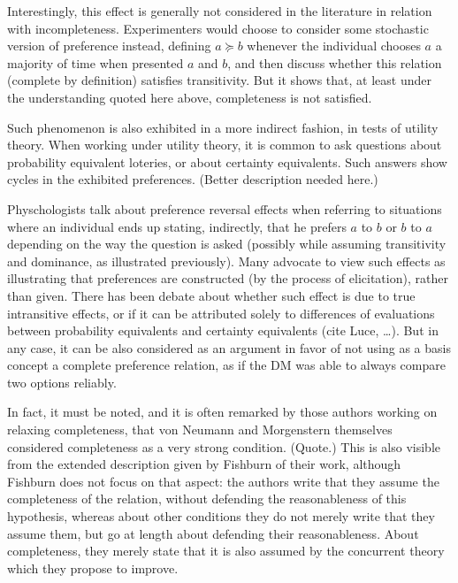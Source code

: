 \documentclass[french, english]{llncs}
\begin{document}
Interestingly, this effect is generally not considered in the literature in relation with incompleteness. Experimenters would choose to consider some stochastic version of preference instead, defining $a \succeq b$ whenever the individual chooses $a$ a majority of time when presented $a$ and $b$, and then discuss whether this relation (complete by definition) satisfies transitivity. But it shows that, at least under the understanding quoted here above, completeness is not satisfied.

Such phenomenon is also exhibited in a more indirect fashion, in tests of utility theory. When working under utility theory, it is common to ask questions about probability equivalent loteries, or about certainty equivalents. Such answers show cycles in the exhibited preferences. (Better description needed here.) 

Physchologists talk about preference reversal effects when referring to situations where an individual ends up stating, indirectly, that he prefers $a$ to $b$ or $b$ to $a$ depending on the way the question is asked (possibly while assuming transitivity and dominance, as illustrated previously). Many advocate to view such effects as illustrating that preferences are constructed (by the process of elicitation), rather than given. There has been debate about whether such effect is due to true intransitive effects, or if it can be attributed solely to differences of evaluations between probability equivalents and certainty equivalents (cite Luce, …). But in any case, it can be also considered as an argument in favor of not using as a basis concept a complete preference relation, as if the \ac{DM} was able to always compare two options reliably.

In fact, it must be noted, and it is often remarked by those authors working on relaxing completeness, that von Neumann and Morgenstern themselves considered completeness as a very strong condition. (Quote.) This is also visible from the extended description given by Fishburn of their work, although Fishburn does not focus on that aspect: the authors write that they assume the completeness of the relation, without defending the reasonableness of this hypothesis, whereas about other conditions they do not merely write that they assume them, but go at length about defending their reasonableness. About completeness, they merely state that it is also assumed by the concurrent theory which they propose to improve.
\end{document}
